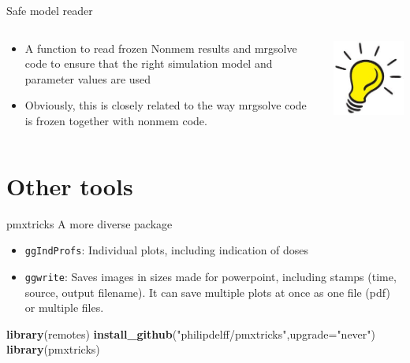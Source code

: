 \documentclass[
  8pt,
  ignorenonframetext,
  aspectratio=169]{beamer}
\newenvironment{Shaded}{\begin{snugshade}}{\end{snugshade}}
\newcommand{\DataTypeTok}[1]{\textcolor[rgb]{0.13,0.29,0.53}{#1}}
\newcommand{\KeywordTok}[1]{\textcolor[rgb]{0.13,0.29,0.53}{\textbf{#1}}}
\newcommand{\NormalTok}[1]{#1}
\newcommand{\StringTok}[1]{\textcolor[rgb]{0.31,0.60,0.02}{#1}}
\providecommand{\tightlist}{%
  \setlength{\itemsep}{0pt}\setlength{\parskip}{0pt}}
\begin{document}
\begin{frame}{Safe model reader}
\protect\hypertarget{safe-model-reader}{}
\begin{columns}[T]
\begin{column}{0.85\textwidth}
\begin{itemize}
\item
  A function to read frozen Nonmem results and mrgsolve code to ensure
  that the right simulation model and parameter values are used
\item
  Obviously, this is closely related to the way mrgsolve code is frozen
  together with nonmem code.
\end{itemize}
\end{column}

\begin{column}{0.15\textwidth}
\includegraphics[width=.5in]{figures/ideabulb.jpg}
\end{column}
\end{columns}
\end{frame}

\hypertarget{other-tools}{%
\section{Other tools}\label{other-tools}}

\begin{frame}[fragile]{pmxtricks}
\protect\hypertarget{pmxtricks}{}
A more diverse package

\begin{itemize}
\tightlist
\item
  \texttt{ggIndProfs}: Individual plots, including indication of doses
\item
  \texttt{ggwrite}: Saves images in sizes made for powerpoint, including
  stamps (time, source, output filename). It can save multiple plots at
  once as one file (pdf) or multiple files.
\end{itemize}

\begin{Shaded}
\begin{Highlighting}[]
\KeywordTok{library}\NormalTok{(remotes)}
\KeywordTok{install\_github}\NormalTok{(}\StringTok{"philipdelff/pmxtricks"}\NormalTok{,}\DataTypeTok{upgrade=}\StringTok{"never"}\NormalTok{)}
\KeywordTok{library}\NormalTok{(pmxtricks)}
\end{Highlighting}
\end{Shaded}
\end{frame}
\end{document}

